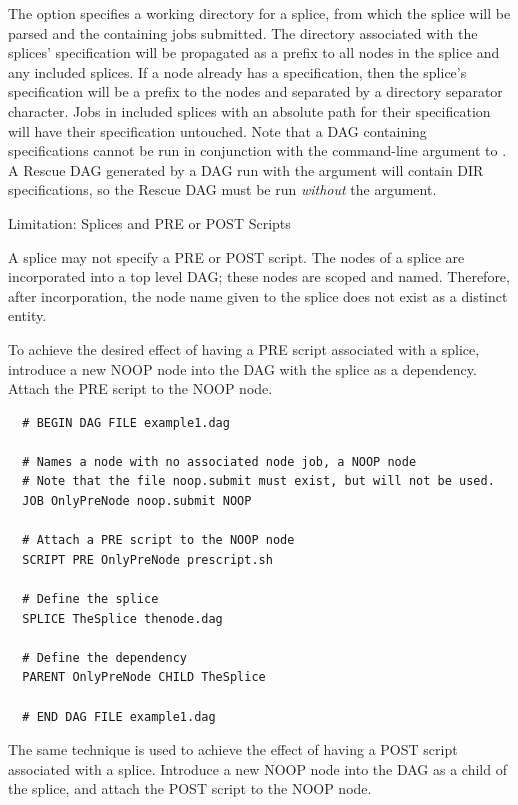 The  option specifies a working directory for a splice,
from which the splice will be parsed and the containing jobs submitted.
The directory associated with the splices'  specification
will be propagated as a prefix to all nodes in the splice and any 
included splices.
If a node already has a  specification, then the splice's
 specification will be a prefix to the nodes and separated by
a directory separator character.
Jobs in included splices with an absolute path for their 
specification will have their  specification untouched.
Note that a DAG containing  specifications cannot be run
in conjunction with the  command-line argument to
.
A Rescue DAG generated by a DAG run with the  argument
will contain DIR specifications, so the Rescue DAG must be run
\emph{without} the  argument.


\begin{description}
\item[Limitation: Splices and PRE or POST Scripts]
\end{description}

A splice may not specify a PRE or POST script.
The nodes of a splice are incorporated into a top level DAG;
these nodes are scoped and named.
Therefore, after incorporation, the node name given to the splice
does not exist as a distinct entity.

To achieve the desired effect of having a PRE script associated with a splice,
introduce a new NOOP node into the DAG with the splice as a dependency.
Attach the PRE script to the NOOP node.
\footnotesize
\begin{verbatim}
  # BEGIN DAG FILE example1.dag

  # Names a node with no associated node job, a NOOP node
  # Note that the file noop.submit must exist, but will not be used.
  JOB OnlyPreNode noop.submit NOOP

  # Attach a PRE script to the NOOP node
  SCRIPT PRE OnlyPreNode prescript.sh

  # Define the splice
  SPLICE TheSplice thenode.dag
 
  # Define the dependency
  PARENT OnlyPreNode CHILD TheSplice

  # END DAG FILE example1.dag
\end{verbatim}
\normalsize

The same technique is used to achieve the effect of having a POST script
associated with a splice.
Introduce a new NOOP node into the DAG as a child of the splice, 
and attach the POST script to the NOOP node.


